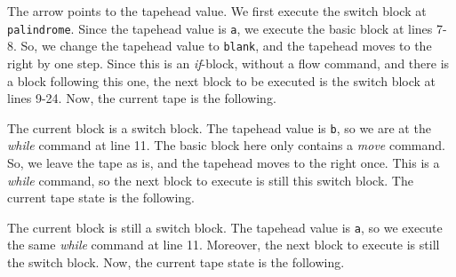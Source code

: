\noindent The arrow points to the tapehead value. We first execute the switch block at \texttt{palindrome}. Since the tapehead value is \texttt{a}, we execute the basic block at lines 7-8. So, we change the tapehead value to \texttt{blank}, and the tapehead moves to the right by one step. Since this is an \textit{if}-block, without a flow command, and there is a block following this one, the next block to be executed is the switch block at lines 9-24. Now, the current tape is the following.
\begin{figure}[H]
    \centering
\end{figure}
\noindent The current block is a switch block. The tapehead value is \texttt{b}, so we are at the \textit{while} command at line 11. The basic block here only contains a \textit{move} command. So, we leave the tape as is, and the tapehead moves to the right once. This is a \textit{while} command, so the next block to execute is still this switch block. The current tape state is the following.
\begin{figure}[H]
    \centering
\end{figure}
\noindent The current block is still a switch block. The tapehead value is \texttt{a}, so we execute the same \textit{while} command at line 11. Moreover, the next block to execute is still the switch block. Now, the current tape state is the following.
\begin{figure}[H]
    \centering
\end{figure}
